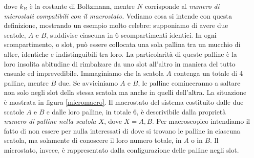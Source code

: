 \noindent dove $k_B$ è la costante di Boltzmann, mentre $N$
corrisponde al \textit{numero di microstati compatibili con il
macrostato}. Vediamo cosa si intende con questa definizione,
mostrando un esempio molto celebre: supponiamo di avere due
scatole, $A$ e $B$, suddivise ciascuna in 6 scompartimenti
identici. In ogni scompartimento, o slot, può essere collocata
una sola pallina tra un mucchio di altre, identiche e indistinguibili
tra loro. La particolarità
di queste palline è la loro insolita abitudine di rimbalzare
da uno slot all'altro in maniera del tutto casuale ed imprevedibile.
Immaginiamo che la scatola $A$ contenga
un totale di 4 palline, mentre $B$ due. Se avviciniamo $A$ e
$B$, le palline cominceranno a saltare non solo negli slot
della stessa scatola ma anche in quelli dell'altra. La situazione è
mostrata in figura \ref{micromacro}. Il macrostato del sistema
costituito dalle due scatole $A$ e $B$ e dalle loro palline,
in totale 6, è descrivibile dalla proprietà \textit{numero di palline nella scatola $X$},
dove $X = A, B$. Per macroscopico intendiamo
il fatto di non essere per nulla interessati di dove si trovano
le palline in ciascuna scatola, ma solamente di conoscere il
loro numero totale, in $A$ o in $B$. Il microstato, invece,
è rappresentato dalla configurazione delle palline negli slot.

